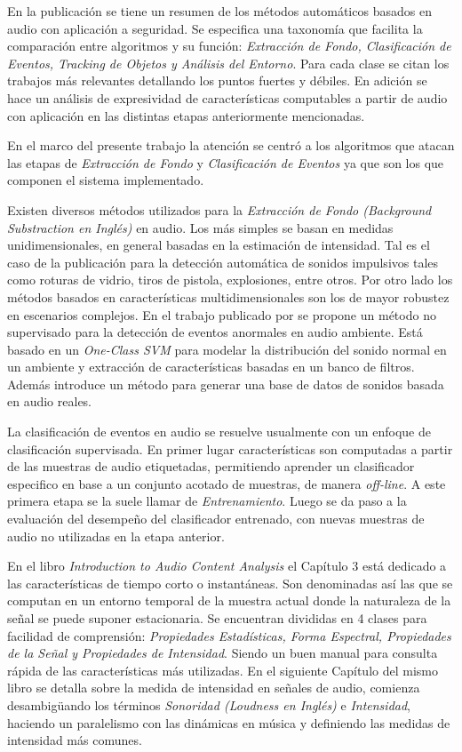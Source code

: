 \documentclass{article}
\begin{document}
\bigskip
En la publicación \cite{crocco2014audio} se tiene un resumen de los métodos automáticos basados en audio con aplicación a seguridad. Se especifica una taxonomía que facilita la comparación entre algoritmos y su función: \textit{Extracción de Fondo, Clasificación de Eventos, Tracking de Objetos y Análisis del Entorno}. Para cada clase se citan los trabajos más relevantes detallando los puntos fuertes y débiles. En adición se hace un análisis de expresividad de características computables a partir de audio con aplicación en las distintas etapas anteriormente mencionadas. 

\bigskip
En el marco del presente trabajo la atención se centró a los algoritmos que atacan las etapas de \textit{Extracción de Fondo} y \textit{Clasificación de Eventos} ya que son los que componen el sistema implementado.

\bigskip
Existen diversos métodos utilizados para la \textit{Extracción de Fondo (Background Substraction en Inglés)} en audio. Los más simples se basan en medidas unidimensionales, en general basadas en la estimación de intensidad. Tal es el caso de la publicación \cite{dufaux2000automatic} para la detección automática de sonidos impulsivos tales como roturas de vidrio, tiros de pistola, explosiones, entre otros. Por otro lado los métodos basados en características multidimensionales son los de mayor robustez en escenarios complejos. En el trabajo publicado por \cite{lecomte2011abnormal} se propone un método no supervisado para la detección de eventos anormales en audio ambiente. Está basado en un \textit{One-Class SVM} para modelar la distribución del sonido normal en un ambiente y extracción de características basadas en un banco de filtros. Además introduce un método para generar una base de datos de sonidos basada en audio reales.
 
\bigskip 
La clasificación de eventos en audio se resuelve usualmente con un enfoque de clasificación supervisada. En primer lugar características son computadas a partir de las muestras de audio etiquetadas, permitiendo aprender un clasificador especifico en base a un conjunto acotado de muestras, de manera \textit{off-line}. A este primera etapa se la suele llamar de \textit{Entrenamiento}. Luego se da paso a la evaluación del desempeño del clasificador entrenado, con nuevas muestras de audio no utilizadas en la etapa anterior. 

\bigskip
En el libro \textit{Introduction to Audio Content Analysis} \citep{Lerch:2012:IAC:2392638} el Capítulo 3 está dedicado a las características de tiempo corto o instantáneas. Son denominadas así las que se computan en un entorno temporal de la muestra actual donde la naturaleza de la señal se puede suponer estacionaria. Se encuentran divididas en 4 clases para facilidad de comprensión: \textit{Propiedades Estadísticas, Forma Espectral, Propiedades de la Señal y Propiedades de Intensidad}. Siendo un buen manual para consulta rápida de las características más utilizadas. En el siguiente Capítulo del mismo libro se detalla sobre la medida de intensidad en señales de audio, comienza desambigüando los términos \textit{Sonoridad (Loudness en Inglés)} e \textit{Intensidad}, haciendo un paralelismo con las dinámicas en música y definiendo las medidas de intensidad más comunes.
\end{document}
